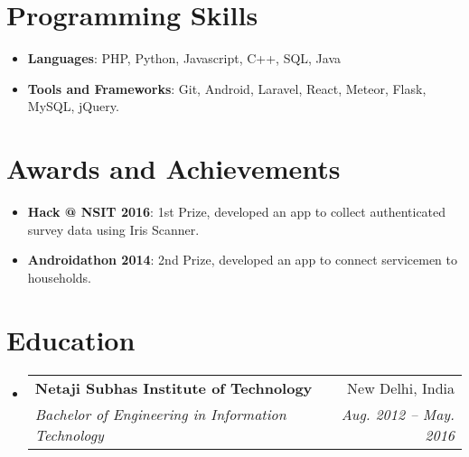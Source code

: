 \documentclass[letterpaper,11pt]{article}
\makeatletter
\newcommand{\resumeItem}[2]{
  \item\small{
    \textbf{#1}{: #2 \vspace{-2pt}}
  }
}
\newcommand{\resumeSubheading}[4]{
  \vspace{-1pt}\item
    \begin{tabular*}{0.97\textwidth}{l@{\extracolsep{\fill}}r}
      \textbf{#1} & #2 \\
      \textit{\small#3} & \textit{\small #4} \\
    \end{tabular*}\vspace{-5pt}
}
\newcommand{\resumeSubItem}[2]{\resumeItem{#1}{#2}\vspace{-4pt}}
\newcommand{\resumeSubHeadingListStart}{\begin{itemize}[leftmargin=*]}
\newcommand{\resumeSubHeadingListEnd}{\end{itemize}}
\makeatother
\begin{document}
  
\section{Programming Skills}
 \resumeSubHeadingListStart
    \resumeSubItem{Languages}
       {PHP, Python, Javascript, C++, SQL, Java}
    \resumeSubItem{Tools and Frameworks}
       {Git, Android, Laravel, React, Meteor, Flask, MySQL, jQuery.}
 \resumeSubHeadingListEnd

\section{Awards and Achievements}
  \resumeSubHeadingListStart
    \resumeSubItem{Hack @ NSIT 2016}
       {1st Prize, developed an app to collect authenticated survey data using Iris Scanner.}
    \resumeSubItem{Androidathon 2014}
       {2nd Prize, developed an app to connect servicemen to households.}
  \resumeSubHeadingListEnd


\section{Education}
  \resumeSubHeadingListStart
    \resumeSubheading
      {Netaji Subhas Institute of Technology}{New Delhi, India}
      {Bachelor of Engineering in Information Technology}{Aug. 2012 -- May. 2016}
  \resumeSubHeadingListEnd
\end{document}
